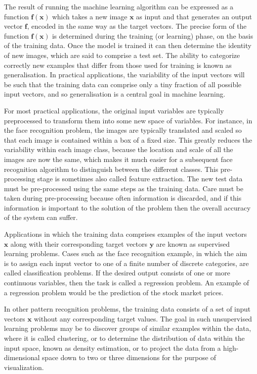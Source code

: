 \documentclass[12pt]{report}
\numberwithin{equation}{section}
\begin{document}
The result of running the machine learning algorithm can be expressed as a function $\bm{f(x)}$ which takes a new image $\bm{x}$ as input and that generates an output vector $\bm{f}$, encoded in the same way as the target vectors. The precise form of the function $\bm{f(x)}$ is determined during the {training} (or {learning}) phase, on the basis of the training data. Once the model is trained it can then determine the identity of new images, which are said to comprise a {test set}. The ability to categorize correctly new examples that differ from those used for training is known as {generalisation}. In practical applications, the variability of the input vectors will be such that the training data can comprise only a tiny fraction of all possible input vectors, and so generalisation is a central goal in machine learning.

For most practical applications, the original input variables are typically preprocessed to transform them into some new space of variables. For instance, in the face recognition problem, the images  are typically translated and scaled so that each image is contained within a box of a fixed size. This greatly reduces the variability within each image class, because the location and scale of all the images are now the same, which makes it much easier for a subsequent face recognition algorithm to distinguish between the different classes. This pre-processing stage is sometimes also called {feature extraction}. The new test data must be pre-processed using the same steps as the training data. Care must be taken during pre-processing because often information is discarded, and if this information is important to the solution of the problem then the overall accuracy of the system can suffer.

Applications in which the training data comprises examples of the input vectors $\bm{x}$ along with their corresponding target vectors $\bm{y}$ are known as {supervised learning} problems. Cases such as the face recognition example, in which the aim is to assign each input vector to one of a finite number of discrete categories, are called {classification problems}. If the desired output consists of one or more continuous variables, then the task is called a {regression problem}. An example of a regression problem would be the prediction of the stock market prices.

In other pattern recognition problems, the training data consists of a set of input vectors $\bm{x}$ without any corresponding target values. The goal in such {unsupervised learning} problems may be to discover groups of similar examples within the data, where it is called {clustering}, or to determine the distribution of data within the input space, known as {density estimation}, or to project the data from a high-dimensional space down to two or three dimensions for the purpose of {visualization}. 
\end{document}
